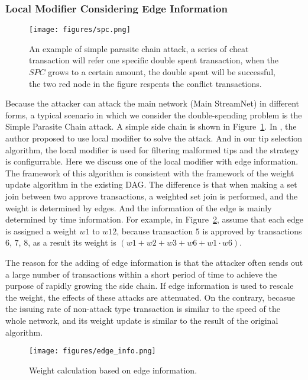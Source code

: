 \subsubsection{Local Modifier Considering Edge Information}

\begin{figure}[!ht]
\begin{center}
\texttt{[image: figures/spc.png]}
    \caption{
        An example of simple parasite chain attack, a series of cheat transaction will refer one specific double spent transaction, 
        when the $SPC$ grows to a certain amount, the double spent will be successful, the two red node in the figure respents the 
        conflict transactions.
     }
\label{spc}
\end{center}
\end{figure}


Because the attacker can attack the main network (Main StreamNet) in different forms,
a typical scenario in which we consider the double-spending problem is the Simple Parasite Chain attack.
A simple side chain is shown in Figure~\ref{spc}. 
In \cite{iota_proof}, the author proposed to use local modifier to solve the attack. And in our tip selection algorithm, 
the local modifier is used for filtering malformed tips and the strategy is configurrable. 
Here we discuss one of the local modifier with edge information.
The framework of this algorithm is consistent with the framework of the weight update algorithm in the existing DAG.
The difference is that when making a set join between two approve transactions, a weighted set join is performed, and the weight is determined by edges. 
And the information of the edge is mainly determined by time information. 
For example, in Figure~\ref{edge_info}, assume that each edge is assigned a weight $w1$ to $w12$, 
because transaction $5$ is approved by transactions $6$, $7$, $8$, as a result its weight is $(w1+w2+w3+w6+w1 \cdot w6)$.

The reason for the adding of edge information is that the attacker often sends out a large number of transactions 
within a short period of time to achieve the purpose of rapidly growing the side chain. 
If edge information is used to rescale the weight, the effects of these attacks are attenuated. 
On the contrary, becasue the issuing rate of non-attack type transaction is similar to the speed of the whole network,
and its weight update is similar to the result of the original algorithm.

\begin{figure}[!ht]
\begin{center}
\texttt{[image: figures/edge\_info.png]}
    \caption{
        Weight calculation based on edge information.
     }
\label{edge_info}
\end{center}
\end{figure}


